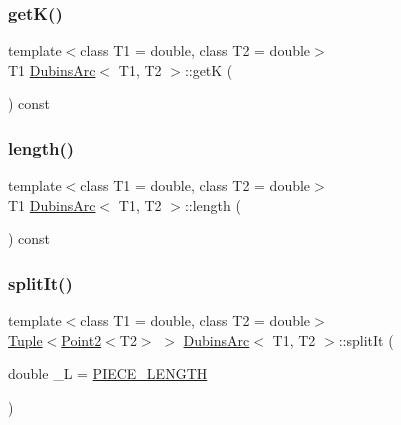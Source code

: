 \subsubsection{\texorpdfstring{getK()}{getK()}}
{\footnotesize\ttfamily template$<$class T1 = double, class T2 = double$>$ \\
T1 \mbox{\hyperlink{class_dubins_arc}{Dubins\+Arc}}$<$ T1, T2 $>$\+::getK (\begin{DoxyParamCaption}{ }\end{DoxyParamCaption}) const\hspace{0.3cm}{\ttfamily [inline]}}

\mbox{\label{class_dubins_arc_a1b0bfacb344d17377f4bda55fdaecae4}} 
\subsubsection{\texorpdfstring{length()}{length()}}
{\footnotesize\ttfamily template$<$class T1 = double, class T2 = double$>$ \\
T1 \mbox{\hyperlink{class_dubins_arc}{Dubins\+Arc}}$<$ T1, T2 $>$\+::length (\begin{DoxyParamCaption}{ }\end{DoxyParamCaption}) const\hspace{0.3cm}{\ttfamily [inline]}}

\mbox{\label{class_dubins_arc_a346c19e3e9f25747e3e3ae9de997e09d}} 
\subsubsection{\texorpdfstring{splitIt()}{splitIt()}}
{\footnotesize\ttfamily template$<$class T1 = double, class T2 = double$>$ \\
\mbox{\hyperlink{class_tuple}{Tuple}}$<$\mbox{\hyperlink{class_point2}{Point2}}$<$T2$>$ $>$ \mbox{\hyperlink{class_dubins_arc}{Dubins\+Arc}}$<$ T1, T2 $>$\+::split\+It (\begin{DoxyParamCaption}\item[{double}]{\+\_\+L = {\ttfamily \mbox{\hyperlink{dubins_8hh_a5b2500ca93a5100f73dc442d3cfea7d4}{P\+I\+E\+C\+E\+\_\+\+L\+E\+N\+G\+TH}}} }\end{DoxyParamCaption})\hspace{0.3cm}{\ttfamily [inline]}}

